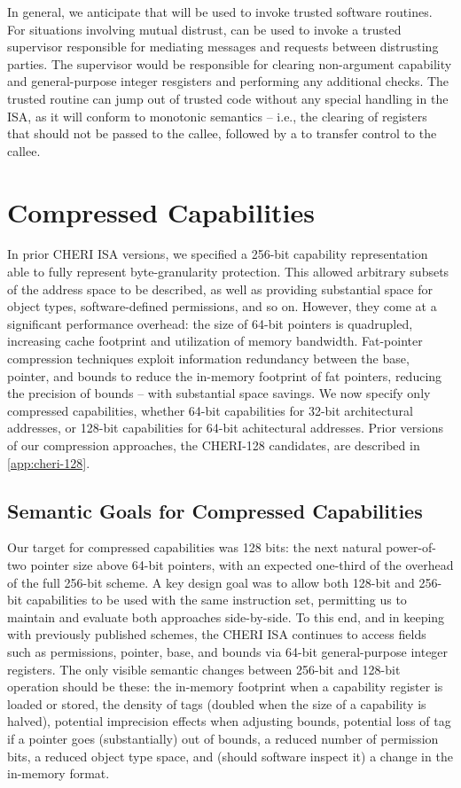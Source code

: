 In general, we anticipate that  will be used
to invoke trusted software routines.  For situations involving
mutual distrust,  can be used to invoke
a trusted supervisor responsible for mediating messages and
requests between distrusting parties.  The supervisor would be
responsible for clearing non-argument capability and general-purpose
integer resgisters and performing any additional checks.
The  trusted
routine can jump out of trusted code without
any special handling in the ISA, as it will conform to monotonic
semantics -- i.e., the clearing of registers that should not be passed to the
callee, followed by a  to transfer control to the callee.

\section{Compressed Capabilities}
\label{sec:rational:comressed}
In prior CHERI ISA versions, we specified a 256-bit capability
representation able to fully represent byte-granularity protection.
This allowed arbitrary subsets of the address space to be described, as well as
providing substantial
space for object types, software-defined permissions, and so on.
However, they come at a significant performance overhead: the size of 64-bit
pointers is quadrupled, increasing cache footprint and utilization of memory
bandwidth.
Fat-pointer compression techniques exploit information redundancy between the
base, pointer, and bounds to reduce the in-memory footprint of fat pointers,
reducing the precision of bounds -- with substantial space savings.
We now specify only compressed capabilities, whether 64-bit capabilities for
32-bit architectural addresses, or 128-bit capabilities for 64-bit
achitectural addresses.
Prior versions of our compression approaches, the CHERI-128 candidates, are
described in \cref{app:cheri-128}.

\subsection{Semantic Goals for Compressed Capabilities}

Our target for compressed capabilities was 128 bits: the next natural
power-of-two pointer size above 64-bit pointers, with an expected one-third of
the overhead of the full 256-bit scheme.
A key design goal was to allow both 128-bit and 256-bit capabilities to be
used with the same instruction set, permitting us to maintain and evaluate
both approaches side-by-side.
To this end, and in keeping with previously published schemes, the CHERI ISA
continues to access fields such as permissions, pointer, base, and bounds via
64-bit general-purpose integer registers.
The only visible semantic changes between 256-bit and 128-bit operation should
be these:
the in-memory footprint when a capability register is loaded or stored,
the density of tags (doubled when the size of a capability is halved),
potential imprecision effects when adjusting bounds, potential loss of tag if
a pointer goes (substantially) out of bounds, a reduced number of permission
bits, a reduced object type space, and (should software inspect it) a change
in the in-memory format.

